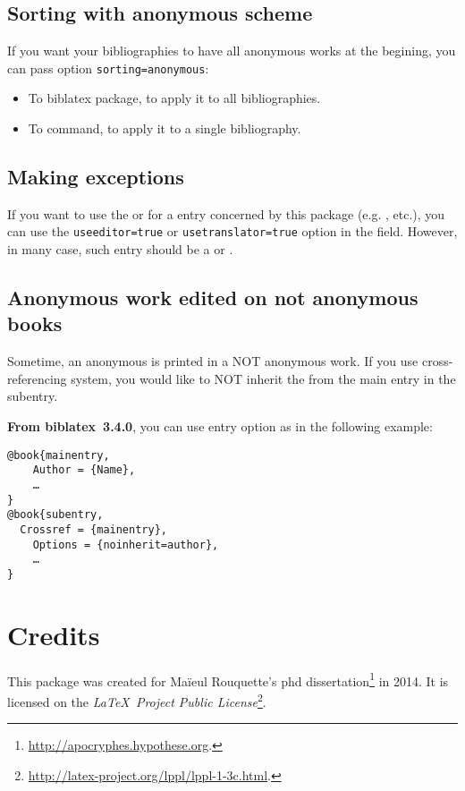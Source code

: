 \documentclass{ltxdockit}[2011/03/25]
\newcommand{\biblatex}{biblatex\xspace}
\begin{document}
\subsection{Sorting with anonymous scheme}

If you want your bibliographies to have all anonymous works at the begining, you can pass option \verb+sorting=anonymous+:

\begin{itemize}
	\item To \biblatex package, to apply it to all bibliographies.
	\item To  command, to apply it to a single bibliography.
\end{itemize}
\subsection{Making exceptions}

If you want to use the  or  for a entry concerned by this package (e.g. ,  etc.), you can use the \verb+useeditor=true+ or \verb+usetranslator=true+ 
option in the  field. However, in many case, such entry should be a  or . 

\subsection{Anonymous work edited on not anonymous books}\label{noinherit}

Sometime, an anonymous  is printed in a NOT anonymous work.
If you use cross-referencing system, you would like to NOT inherit the  from the main entry in the subentry.

\textbf{From \biblatex~3.4.0}, you can use entry option  as in the following example:

\begin{verbatim}
@book{mainentry,
	Author = {Name},
	…
}
@book{subentry,
  Crossref = {mainentry},
	Options = {noinherit=author},
	…
}
\end{verbatim}
\section{Credits}

This package was created for Maïeul Rouquette's phd dissertation\footnote{\url{http://apocryphes.hypothese.org}.} in 2014. It is licensed on the \emph{\LaTeX\ Project Public License}\footnote{\url{http://latex-project.org/lppl/lppl-1-3c.html}.}. 
\end{document}
